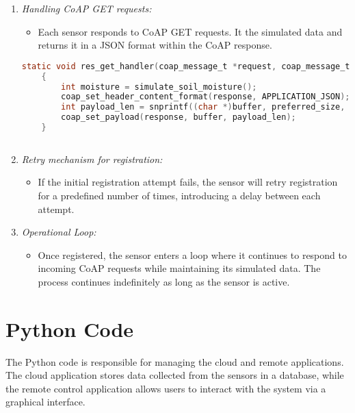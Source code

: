 \begin{enumerate}
    \item \textit{Handling CoAP GET requests:}
          \begin{itemize}
              \item Each sensor responds to CoAP GET requests. It the simulated data and returns it in a JSON format within the CoAP response.
          \end{itemize}
          \begin{lstlisting}[language=C]
    static void res_get_handler(coap_message_t *request, coap_message_t *response, uint8_t *buffer, uint16_t preferred_size, int32_t *offset)
    {
        int moisture = simulate_soil_moisture();
        coap_set_header_content_format(response, APPLICATION_JSON);
        int payload_len = snprintf((char *)buffer, preferred_size, "{\"moisture\":%d}", moisture);
        coap_set_payload(response, buffer, payload_len);
    }
        
    \end{lstlisting}

    \item \textit{Retry mechanism for registration:}
          \begin{itemize}
              \item If the initial registration attempt fails, the sensor will retry registration for a predefined number of times, introducing a delay between each attempt.
          \end{itemize}

    \item \textit{Operational Loop:}
          \begin{itemize}
              \item Once registered, the sensor enters a loop where it continues to respond to incoming CoAP requests while maintaining its simulated data. The process continues indefinitely as long as the sensor is active.
          \end{itemize}

\end{enumerate}


\newpage

\section{Python Code}


The Python code is responsible for managing the cloud and remote applications. The cloud application stores data collected from the sensors in a database, while the remote control application allows users to interact with the system via a graphical interface.\\

